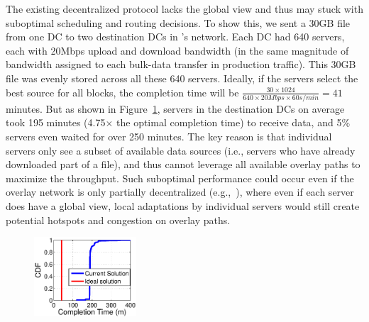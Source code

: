The existing decentralized protocol lacks the global view and thus 
may stuck with suboptimal scheduling and routing decisions.
To show this, we sent a 30GB file from one DC to two destination
DCs in \company's network. Each DC had 640 servers, each with 20Mbps 
upload and download bandwidth (in the same magnitude of bandwidth 
assigned to each bulk-data transfer in production traffic).
This 30GB file was evenly stored across all these 640 servers.
Ideally, if the servers select the best source for all blocks, the 
completion time will be
$\frac{30\times 1024}{640\times 20Mbps \times 60s/min} = 41$
minutes. But as shown in Figure~\ref{fig:motivation},
servers in the destination DCs on average took 195 minutes (4.75$\times$ 
the optimal completion time) to receive data, and 5\% servers even 
waited for over 250 minutes.
The key reason is that individual servers only see a subset of 
available data sources (i.e., servers who have already downloaded part of 
a file), and thus cannot leverage all available overlay paths to
maximize the throughput. Such suboptimal performance could occur even if 
the overlay network is only partially decentralized (e.g.,~\cite{Huang2014A}), 
where even if each server does have a global view, local adaptations by 
individual servers would still create potential hotspots and congestion on 
overlay paths.


\begin{figure}[t]
  \centering
  \includegraphics[width=1.5in]{images/SEvsIdeal.eps}
  \vspace{-0.2cm}
  \label{fig:motivation}
\vspace{-0.4cm}
\end{figure}

